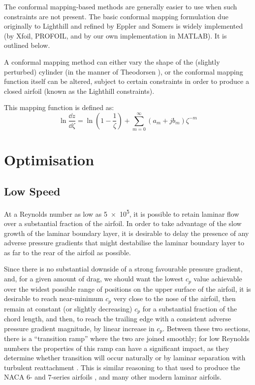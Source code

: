 \documentclass[12pt]{article}
\begin{document}
The conformal mapping-based methods are generally easier to use when such constraints are not present. The basic conformal mapping formulation due originally to Lighthill \cite{lighthill} and refined by Eppler and Somers \cite{epplerandsomers} is widely implemented (by Xfoil, PROFOIL, and by our own implementation in MATLAB). It is outlined below.

A conformal mapping method can either vary the shape of the (slightly perturbed) cylinder (in the manner of Theodorsen \cite{lighthill}), or the conformal mapping function itself can be altered, subject to certain constraints in order to produce a closed airfoil (known as the Lighthill constraints). 

This mapping function is defined as:
\[
\ln \frac{\dd{z}}{\dd{\zeta}} = \ln \left(1 - \frac{1}{\zeta}\right) + \sum_{m=0}^\infty \left(a_m+j b_m\right)\zeta^{-m}
\]
\section{Optimisation}
\subsection{Low Speed}
At a Reynolds number as low as \num{5e5}, it is possible to retain laminar flow over a substantial fraction of the airfoil. In order to take advantage of the slow growth of the laminar boundary layer, it is desirable to delay the presence of any adverse pressure gradients that might destabilise the laminar boundary layer to as far to the rear of the airfoil as possible.

Since there is no substantial downside of a strong favourable pressure gradient, and, for a given amount of drag, we should want the lowest $c_p$ value achievable over the widest possible range of positions on the upper surface of the airfoil, it is desirable to reach near-minimum $c_p$ very close to the nose of the airfoil, then remain at constant (or slightly decreasing) $c_p$ for a substantial fraction of the chord length, and then, to reach the trailing edge with a consistent adverse pressure gradient magnitude, by linear increase in $c_p$. Between these two sections, there is a ``transition ramp'' where the two are joined smoothly; for low Reynolds numbers the properties of this ramp can have a significant impact, as they determine whether transition will occur naturally or by laminar separation with turbulent reattachment \cite{lowspeeddesign}. This is similar reasoning to that used to produce the NACA 6- and 7-series airfoils \cite{naca6seriessummary}, and many other modern laminar airfoils.
\end{document}
